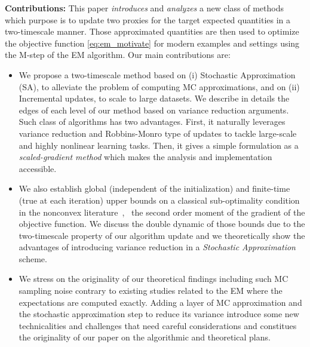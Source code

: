 \documentclass[conference,letterpaper]{IEEEtran}
\begin{document}
\vspace{0.08in}
\noindent \textbf{Contributions:} This paper \textit{introduces} and \textit{analyzes} a new class of methods which purpose is to update two proxies for the target expected quantities in a two-timescale manner. 
Those approximated quantities are then used to optimize the objective function \eqref{eq:em_motivate} for modern examples and settings using the \textsf{M-step} of the EM algorithm.
Our main contributions are:
\begin{itemize}
\item We propose a two-timescale method based on \textsf{(i)} Stochastic Approximation (SA), to alleviate the problem of computing MC approximations, and on \textsf{(ii)} Incremental updates, to scale to large datasets. We describe in details the edges of each level of our method based on variance reduction arguments. Such class of algorithms has two advantages. First, it naturally leverages variance reduction and Robbins-Monro type of updates to tackle large-scale and highly nonlinear learning tasks. Then, it gives a simple formulation as a \textit{scaled-gradient method} which makes the analysis and implementation accessible.
\item We also establish global (independent of the initialization) and finite-time (true at each iteration) upper bounds on a classical sub-optimality condition in the nonconvex literature~\cite{jain2017non, ghadimi2013stochastic}, \ie\ the second order moment of the gradient of the objective function. 
We discuss the double dynamic of those bounds due to the two-timescale property of our algorithm update and we theoretically show the advantages of introducing variance reduction in a \emph{Stochastic Approximation}~\cite{robbins1951stochastic} scheme.
\item We stress on the originality of our theoretical findings including such MC sampling noise contrary to existing studies related to the EM where the expectations are computed exactly. 
Adding a layer of MC approximation and the stochastic approximation step to reduce its variance introduce some new technicalities and challenges that need careful considerations and constitues the originality of our paper on the algorithmic and theoretical plans.
\end{itemize}
\end{document}
